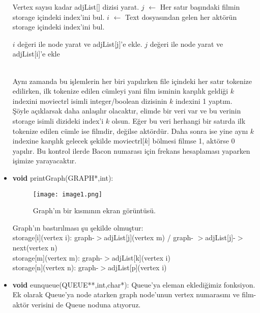 \documentclass[11pt]{article}
\begin{document}
\begin{itemize}
\begin{algorithm}
\begin{algorithmic}[1]
    \State Vertex sayısı kadar adjList[] dizisi yarat.
    \State $j$ $\leftarrow$ Her satır başındaki filmin \textsf{storage} içindeki index'ini bul.
    \State $i$ $\leftarrow$ Text dosyasından gelen her aktörün \textsf{storage} içindeki index'ini bul. 
    
    \State $i$ değeri ile node yarat ve adjList[j]'e ekle. 
    \State $j$ değeri ile node yarat ve adjList[i]'e ekle
\end{algorithmic}
\end{algorithm}\\
Aynı zamanda bu işlemlerin her biri yapılırken file içindeki her satır tokenize edilirken, ilk tokenize edilen cümleyi yani film isminin karşılık geldiği $k$ indexini moviectrl isimli integer/boolean dizisinin $k$ indexini 1 yaptım.\\ 
Şöyle açıklarsak daha anlaşılır olacaktır, elimde bir veri var ve bu verinin storage isimli dizideki index'i $k$ olsun. Eğer bu veri herhangi bir satırda ilk tokenize edilen cümle ise filmdir, değilse aktördür. Daha sonra ise yine aynı $k$ indexine karşılık gelecek şekilde \textsf{moviectrl[$k$]} bölmesi filmse 1, aktörse 0 yapılır. Bu kontrol ilerde Bacon numarası için frekans hesaplaması yaparken işimize yarayacaktır.
\item \textbf{void} \textsf{printGraph(GRAPH*,int):}
\begin{figure}[H]
\centering
\texttt{[image: image1.png]}
\caption{Graph'ın bir kısmının ekran görüntüsü.}
\label{fig:figure3}
\end{figure}
Graph'ın bastırılması şu şekilde olmuştur:\\
storage[i](vertex i): graph-$>$adjList[j](vertex m) / graph- $>$adjList[j]-$>$next(vertex n)\\
storage[m](vertex m): graph-$>$adjList[k](vertex i)\\
storage[n](vertex n): graph-$>$adjList[p](vertex i)\\

	\item \textbf{void} \textsf{eunqueue(QUEUE**,int,char*):} Queue'ya eleman eklediğimiz fonksiyon. Ek olarak Queue'ya node atarken graph node'unun vertex numarasını ve film-aktör verisini de Queue noduna atıyoruz.


\end{itemize}
\end{document}
